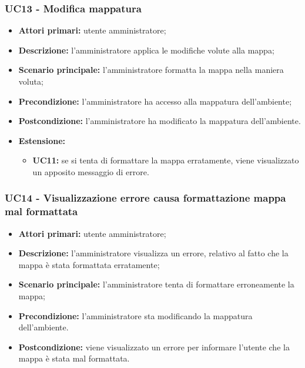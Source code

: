 	\subsubsection{UC13 - Modifica mappatura}
	\begin{itemize}
		\item \textbf{Attori primari:} utente amministratore;
		\item \textbf{Descrizione:} l'amministratore applica le modifiche volute alla mappa;
		\item \textbf{Scenario principale:} l'amministratore formatta la mappa nella maniera voluta;		
		\item \textbf{Precondizione:} l'amministratore ha accesso alla mappatura dell'ambiente;
		\item \textbf{Postcondizione:} l'amministratore ha modificato la mappatura dell'ambiente.
		\item \textbf{Estensione:}
		\begin{itemize}
			\item \textbf{UC11:} se si tenta di formattare la mappa erratamente, viene visualizzato un apposito messaggio di errore.
		\end{itemize}
	\end{itemize}

\subsubsection{UC14 - Visualizzazione errore causa formattazione mappa mal formattata}
	\begin{itemize}
		\item \textbf{Attori primari:} utente amministratore;
		\item \textbf{Descrizione:} l'amministratore visualizza un errore, relativo al fatto che la mappa è stata formattata erratamente;
		\item \textbf{Scenario principale:} l'amministratore tenta di formattare erroneamente la mappa;
		\item \textbf{Precondizione:} l'amministratore sta modificando la mappatura dell'ambiente.
		\item \textbf{Postcondizione:} viene visualizzato un errore per informare l'utente che la mappa è stata mal formattata.
	\end{itemize}


